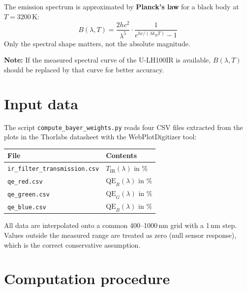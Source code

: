 \documentclass[11pt, a4paper]{article}
\begin{document}
The emission spectrum is approximated by \textbf{Planck's law} for a
black body at $T = 3200$\,K:
\begin{equation}
  B(\lambda, T) = \frac{2hc^2}{\lambda^5}
                  \cdot \frac{1}{e^{hc/(\lambda k_B T)} - 1}
\end{equation}
Only the spectral shape matters, not the absolute magnitude.

\textbf{Note:} If the measured spectral curve of the U-LH100IR is
available, $B(\lambda, T)$ should be replaced by that curve for better
accuracy.

\section{Input data}

The script \texttt{compute\_bayer\_weights.py} reads four CSV files
extracted from the plots in the Thorlabs datasheet with the
WebPlotDigitizer tool:

\begin{center}
\begin{tabular}{ll}
\toprule
\textbf{File} & \textbf{Contents} \\
\midrule
\texttt{ir\_filter\_transmission.csv} & $T_{\mathrm{IR}}(\lambda)$ in \% \\
\texttt{qe\_red.csv}   & $\mathrm{QE}_R(\lambda)$ in \% \\
\texttt{qe\_green.csv} & $\mathrm{QE}_G(\lambda)$ in \% \\
\texttt{qe\_blue.csv}  & $\mathrm{QE}_B(\lambda)$ in \% \\
\bottomrule
\end{tabular}
\end{center}

All data are interpolated onto a common 400--1000\,nm grid with a 1\,nm
step. Values outside the measured range are treated as zero (null
sensor response), which is the correct conservative assumption.

\section{Computation procedure}
\end{document}
